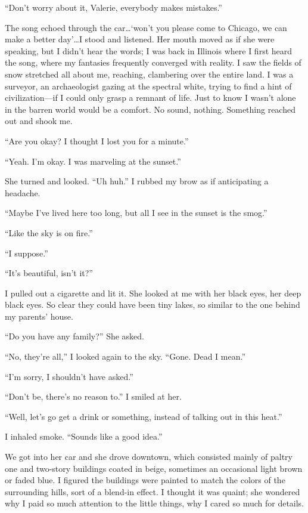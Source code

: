 ``Don't worry about it, Valerie, everybody makes mistakes.''

The song echoed through the car\ldots`won't you please come to Chicago,
we can make a better day'\ldots I stood and listened. Her mouth moved as
if she were speaking, but I didn't hear the words; I was back in
Illinois where I first heard the song, where my fantasies frequently
converged with reality. I saw the fields of snow stretched all about me,
reaching, clambering over the entire land. I was a surveyor, an
archaeologist gazing at the spectral white, trying to find a hint of
civilization---if I could only grasp a remnant of life. Just to know I
wasn't alone in the barren world would be a comfort. No sound, nothing.
Something reached out and shook me.

``Are you okay? I thought I lost you for a minute.''

``Yeah. I'm okay. I was marveling at the sunset.''

She turned and looked. ``Uh huh.'' I rubbed my brow as if anticipating a
headache.

``Maybe I've lived here too long, but all I see in the sunset is the
smog.''

``Like the sky is on fire.''

``I suppose.''

``It's beautiful, isn't it?''

I pulled out a cigarette and lit it. She looked at me with her black
eyes, her deep black eyes. So clear they could have been tiny lakes, so
similar to the one behind my parents' house.

``Do you have any family?'' She asked.

``No, they're all,'' I looked again to the sky. ``Gone. Dead I mean.''

``I'm sorry, I shouldn't have asked.''

``Don't be, there's no reason to.'' I smiled at her.

``Well, let's go get a drink or something, instead of talking out in
this heat.''

I inhaled smoke. ``Sounds like a good idea.''

We got into her car and she drove downtown, which consisted mainly of
paltry one and two-story buildings coated in beige, sometimes an
occasional light brown or faded blue. I figured the buildings were
painted to match the colors of the surrounding hills, sort of a blend-in
effect. I thought it was quaint; she wondered why I paid so much
attention to the little things, why I cared so much for details.

